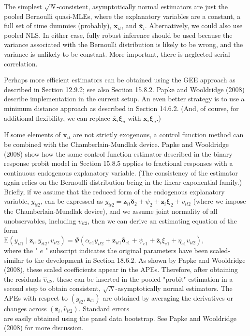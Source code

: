 \documentclass[10pt]{article}
\begin{document}
The simplest $\sqrt{N}$-consistent, asymptotically normal estimators are just the pooled Bernoulli quasi-MLEs, where the explanatory variables are a constant, a full set of time dummies (probably), $\mathbf{x}_{i t}$, and $\overline{\mathbf{x}}_{i}$. Alternatively, we could also use pooled NLS. In either case, fully robust inference should be used because the variance associated with the Bernoulli distribution is likely to be wrong, and the variance is unlikely to be constant. More important, there is neglected serial correlation.

Perhaps more efficient estimators can be obtained using the GEE approach as described in Section 12.9.2; see also Section 15.8.2. Papke and Wooldridge (2008) describe implementation in the current setup. An even better strategy is to use a minimum distance approach as described in Section 14.6.2. (And, of course, for additional flexibility, we can replace $\overline{\mathbf{x}}_{i} \boldsymbol{\xi}_{a}$ with $\mathbf{x}_{i} \boldsymbol{\xi}_{a}$.)

If some elements of $\mathbf{x}_{i t}$ are not strictly exogenous, a control function method can be combined with the Chamberlain-Mundlak device. Papke and Wooldridge (2008) show how the same control function estimator described in the binary response probit model in Section 15.8.5 applies to fractional responses with a continuous endogenous explanatory variable. (The consistency of the estimator again relies on the Bernoulli distribution being in the linear exponential family.) Briefly, if we assume that the reduced form of the endogenous explanatory variable, $y_{i t 2}$, can be expressed as $y_{i t 2}=\mathbf{z}_{i t} \boldsymbol{\delta}_{2}+\psi_{2}+\overline{\mathbf{z}}_{i} \boldsymbol{\xi}_{2}+v_{i t 2}$ (where we impose the Chamberlain-Mundlak device), and we assume joint normality of all unobservables, including $v_{i t 2}$, then we can derive an estimating equation of the form\\
$\mathrm{E}\left(y_{i t 1} \mid \mathbf{z}_{i}, y_{i t 2}, v_{i t 2}\right)=\Phi\left(\alpha_{e 1} y_{i t 2}+\mathbf{z}_{i t 1} \boldsymbol{\delta}_{e 1}+\psi_{e 1}+\overline{\mathbf{z}}_{i} \xi_{e 1}+\eta_{e 1} v_{i t 2}\right)$,\\
where the " $e$ " subscript indicates the original parameters have been scaled-similar to the development in Section 18.6.2. As shown by Papke and Wooldridge (2008), these scaled coefficients appear in the APEs. Therefore, after obtaining the residuals $\hat{v}_{i t 2}$, these can be inserted in the pooled "probit" estimation in a second step to obtain consistent, $\sqrt{N}$-asymptotically normal estimators. The APEs with respect to $\left(y_{t 2}, \mathbf{z}_{t 1}\right)$ are obtained by averaging the derivatives or changes across $\left(\overline{\mathbf{z}}_{i}, \hat{v}_{i t 2}\right)$. Standard errors\\
are easily obtained using the panel data bootstrap. See Papke and Wooldridge (2008) for more discussion.
\end{document}
